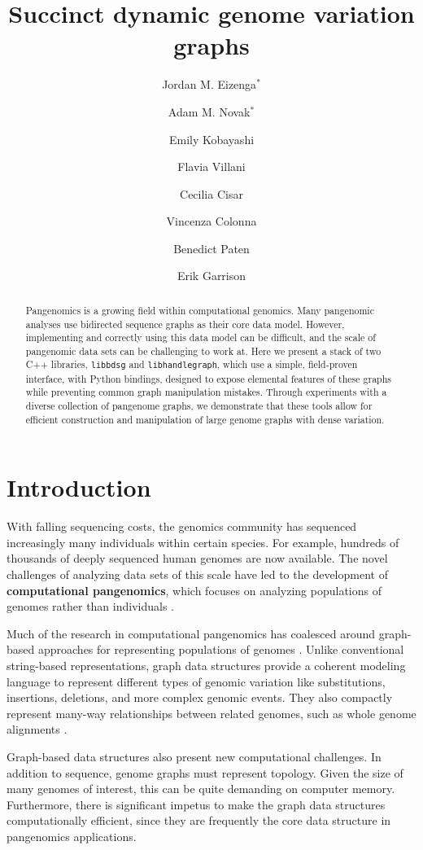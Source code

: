 \documentclass{article}
\title{Succinct dynamic genome variation graphs} %
\author{Jordan M. Eizenga$^*$ \and Adam M. Novak$^*$ \and Emily Kobayashi \and Flavia Villani  \and Cecilia Cisar \and Vincenza Colonna \and Benedict Paten \and Erik Garrison}
\newcommand{\vocab}{\textbf}
\begin{document}
\maketitle

\begin{abstract}

Pangenomics is a growing field within computational genomics.
Many pangenomic analyses use bidirected sequence graphs as their core data model.
However, implementing and correctly using this data model can be difficult, and the scale of pangenomic data sets can be challenging to work at.
Here we present a stack of two C++ libraries, \texttt{libbdsg} and \texttt{libhandlegraph}, which use a simple, field-proven interface, with Python bindings, designed to expose elemental features of these graphs while preventing common graph manipulation mistakes.
Through experiments with a diverse collection of pangenome graphs, we demonstrate that these tools allow for efficient construction and manipulation of large genome graphs with dense variation.

\end{abstract}

\section{Introduction}


With falling sequencing costs, the genomics community has sequenced increasingly many individuals within certain species.
For example, hundreds of thousands of deeply sequenced human genomes are now available.
The novel challenges of analyzing data sets of this scale have led to the development of \vocab{computational pangenomics}, which focuses on analyzing populations of genomes rather than individuals \cite{computational2016computational}.

Much of the research in computational pangenomics has coalesced around graph-based approaches for representing populations of genomes \cite{Paten_2017}.
Unlike conventional string-based representations, graph data structures provide a coherent modeling language to represent different types of genomic variation like substitutions, insertions, deletions, and more complex genomic events.
They also compactly represent many-way relationships between related genomes, such as whole genome alignments \cite{kehr2014genome}.

Graph-based data structures also present new computational challenges.
In addition to sequence, genome graphs must represent topology.
Given the size of many genomes of interest, this can be quite demanding on computer memory.
Furthermore, there is significant impetus to make the graph data structures computationally efficient, since they are frequently the core data structure in pangenomics applications.
\end{document}
